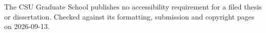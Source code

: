 %
%




	{The CSU Graduate School publishes no accessibility requirement for a filed
	 thesis or dissertation. Checked against its formatting, submission and
	 copyright pages on 2026-09-13.}

